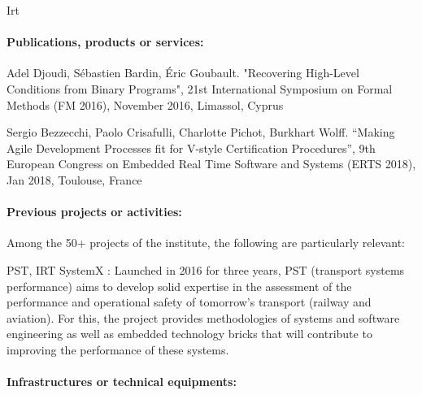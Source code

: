 \begin{sitedescription}{Irt}
\paragraph*{Publications, products or services:}


\begin{compactitem}
\item Adel Djoudi, Sébastien Bardin, Éric Goubault. "Recovering High-Level Conditions from Binary Programs", 21st International Symposium on Formal Methods (FM 2016), November 2016, Limassol, Cyprus
\item Sergio Bezzecchi, Paolo Crisafulli, Charlotte Pichot, Burkhart Wolff. “Making Agile Development Processes fit for V-style Certification Procedures”, 9th European Congress on Embedded Real Time Software and Systems (ERTS 2018), Jan 2018, Toulouse, France
\end{compactitem}





\paragraph*{Previous projects or activities:}


Among the 50+ projects of the institute, the following are particularly relevant:


\begin{compactitem}
\item PST, IRT SystemX : Launched in 2016 for three years, PST (transport systems performance) aims to develop solid expertise in the assessment of the performance and operational safety of tomorrow’s transport (railway and aviation). For this, the project provides methodologies of systems and software engineering as well as embedded technology bricks that will contribute to improving the performance of these systems.

\end{compactitem}






\paragraph*{Infrastructures or technical equipments:}


\end{sitedescription}
